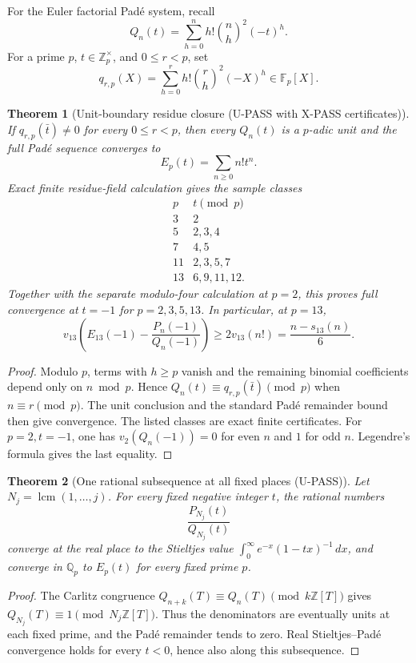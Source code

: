 \documentclass[11pt]{article}
\theoremstyle{keio}
\newtheorem{theorem}{Theorem}[section]
\theoremstyle{definition}
\theoremstyle{remark}
\newcommand{\Q}{\mathbb Q}
\newcommand{\Z}{\mathbb Z}
\newcommand{\lcm}{\operatorname{lcm}}
\newcommand{\UPASS}{\textcolor{keiogreen}{\textsf{U-PASS}}}
\newcommand{\XPASS}{\textcolor{keioxblue}{\textsf{X-PASS}}}
\begin{document}
For the Euler factorial Pad\'e system, recall
\[
 Q_n(t)=\sum_{h=0}^nh!\binom nh^2(-t)^h.
\]
For a prime \(p\), \(t\in\Z_p^\times\), and \(0\le r<p\), set
\[
 q_{r,p}(X)=\sum_{h=0}^rh!\binom rh^2(-X)^h\in\mathbb F_p[X].
\]

\begin{theorem}[Unit-boundary residue closure (\UPASS{} with \XPASS{}
certificates)]
\label{thm:transfer-padic-residue}
If \(q_{r,p}(\bar t)\ne0\) for every \(0\le r<p\), then every
\(Q_n(t)\) is a \(p\)-adic unit and the full Pad\'e sequence converges to
\[
 E_p(t)=\sum_{n\ge0}n!t^n.
\]
Exact finite residue-field calculation gives the sample classes
\[
\begin{array}{c|l}
p& t\pmod p\\ \hline
3&2\\
5&2,3,4\\
7&4,5\\
11&2,3,5,7\\
13&6,9,11,12.
\end{array}
\]
Together with the separate modulo-four calculation at \(p=2\), this proves
full convergence at \(t=-1\) for \(p=2,3,5,13\).  In particular, at
\(p=13\),
\[
 v_{13}\!\left(E_{13}(-1)-\frac{P_n(-1)}{Q_n(-1)}\right)
 \ge2v_{13}(n!)=\frac{n-s_{13}(n)}6.
\]
\end{theorem}

\begin{proof}
Modulo \(p\), terms with \(h\ge p\) vanish and the remaining binomial
coefficients depend only on \(n\bmod p\).  Hence
\(Q_n(t)\equiv q_{r,p}(\bar t)\pmod p\) when \(n\equiv r\pmod p\).
The unit conclusion and the standard Pad\'e remainder bound then give
convergence.  The listed classes are exact finite certificates.  For
\(p=2,t=-1\), one has \(v_2(Q_n(-1))=0\) for even \(n\) and \(1\) for odd
\(n\).  Legendre's formula gives the last equality.
\end{proof}

\begin{theorem}[One rational subsequence at all fixed places (\UPASS)]
\label{thm:transfer-common-subsequence}
Let \(N_j=\lcm(1,\ldots,j)\).  For every fixed negative integer \(t\),
the rational numbers
\[
 \frac{P_{N_j}(t)}{Q_{N_j}(t)}
\]
converge at the real place to the Stieltjes value
\(\int_0^\infty e^{-x}(1-tx)^{-1}\,dx\), and converge in \(\Q_p\) to
\(E_p(t)\) for every fixed prime \(p\).
\end{theorem}

\begin{proof}
The Carlitz congruence
\(Q_{n+k}(T)\equiv Q_n(T)\pmod{k\Z[T]}\) gives
\(Q_{N_j}(T)\equiv1\pmod{N_j\Z[T]}\).  Thus the denominators are eventually
units at each fixed prime, and the Pad\'e remainder tends to zero.  Real
Stieltjes--Pad\'e convergence holds for every \(t<0\), hence also along
this subsequence.
\end{proof}
\end{document}
